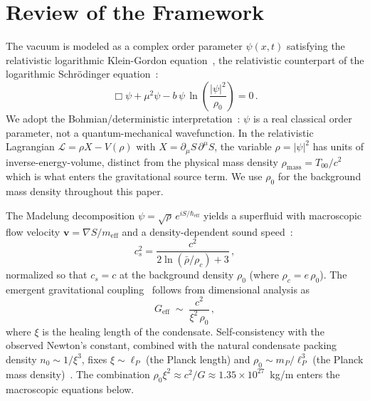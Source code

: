 \documentclass[12pt, a4paper]{article}
\newcommand{\Geff}{G_{\mathrm{eff}}}
\newcommand{\meff}{m_{\mathrm{eff}}}
\newcommand{\heff}{\hbar_{\mathrm{eff}}}
\newcommand{\rhob}{\bar{\rho}}
\begin{document}
\section{Review of the Framework}
\label{sec:review}

The vacuum is modeled as a complex order parameter $\psi(x,t)$ satisfying the relativistic logarithmic Klein-Gordon equation~\cite{rosen_1969,bartkowski_gorka_2008}, the relativistic counterpart of the logarithmic Schr\"{o}dinger equation~\cite{bialynicki_birula_1979}:
\begin{equation}
    \Box\psi + \mu^2\psi - b\,\psi\,\ln\!\left(\frac{|\psi|^2}{\rho_0}\right) = 0\,.
\label{eq:log_kg}
\end{equation}
We adopt the Bohmian/deterministic interpretation~\cite{madelung_1927,bohm_1952,holland_1993}: $\psi$ is a real classical order parameter, not a quantum-mechanical wavefunction. In the relativistic Lagrangian $\mathcal{L} = \rho X - V(\rho)$ with $X = \partial_\mu S\,\partial^\mu S$, the variable $\rho = |\psi|^2$ has units of inverse-energy-volume, distinct from the physical mass density $\rho_{\mathrm{mass}} = T_{00}/c^2$ which is what enters the gravitational source term. We use $\rho_0$ for the background mass density throughout this paper.

The Madelung decomposition $\psi = \sqrt{\rho}\,e^{iS/\heff}$ yields a superfluid with macroscopic flow velocity $\mathbf{v} = \nabla S/\meff$ and a density-dependent sound speed~\cite{kulangiev_2026a}:
\begin{equation}
    c_s^2 = \frac{c^2}{2\ln(\rhob/\rho_c) + 3}\,,
\label{eq:cs_log}
\end{equation}
normalized so that $c_s = c$ at the background density $\rho_0$ (where $\rho_c = e\,\rho_0$). The emergent gravitational coupling~\cite{kulangiev_2026b} follows from dimensional analysis as
\begin{equation}
    \Geff \;\sim\; \frac{c^2}{\xi^2\,\rho_0}\,,
\label{eq:G_eff}
\end{equation}
where $\xi$ is the healing length of the condensate. Self-consistency with the observed Newton's constant, combined with the natural condensate packing density $n_0 \sim 1/\xi^3$, fixes $\xi \sim \ell_P$ (the Planck length) and $\rho_0 \sim m_P/\ell_P^3$ (the Planck mass density)~\cite{kulangiev_2026e}. The combination $\rho_0\xi^2 \approx c^2/G \approx 1.35 \times 10^{27}$~kg/m enters the macroscopic equations below.
\end{document}

